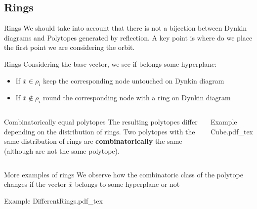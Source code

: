 \documentclass{beamer}
\newcommand{\incfig}[1]{%
\center
\def\svgwidth{0.9\columnwidth}
{#1.pdf_tex}
}
\begin{document}
\subsection{Rings}
\begin{frame}{Rings}
  We should take into account that there is not a bijection between Dynkin diagrams and Polytopes generated by reflection. A key point is where do we place the first point we are considering the orbit.
  \begin{block}{Rings}
   Considering the base vector, we see if belongs some hyperplane:
   \begin{itemize}[topsep=-6pt, itemsep=0pt]
     \item If $\overline{x}\in \rho _i$ keep the corresponding node untouched on Dynkin diagram
     \item If $\overline{x}\not\in \rho _i$ round the corresponding node with a ring on Dynkin diagram
   \end{itemize}
  \end{block}
  \begin{columns}[c]
  \begin{block}{Combinatorically equal polytopes}
  The resulting polytopes differ depending on the distribution of rings. Two polytopes with the same distribution of rings are \textbf{combinatorically} the same (although are not the same polytope).
  \end{block}
  \begin{block}{Example}
   \incfig{Cube} 
  \end{block}
  \end{columns}
\end{frame}

\begin{frame}{More examples of rings}
  We observe how the combinatoric class of the polytope changes if the vector $\overline{x}$ belongs to some hyperplane or not
  \begin{block}{Example}
   \incfig{DifferentRings} 
  \end{block}
\end{frame}
\end{document}
